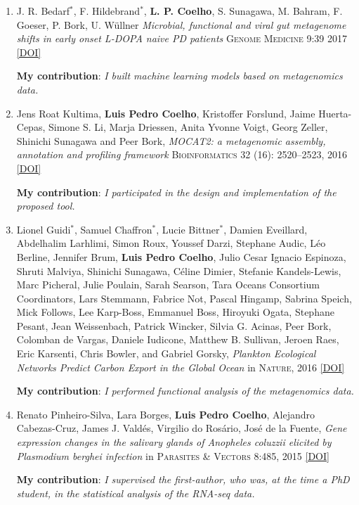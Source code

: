 \documentclass{article}
\newcommand\showdoi[1]{%
    \href{http://dx.doi.org/#1}{[DOI]}%
}
\newcommand\pubname[1]{\textsc{#1}}
\newcommand\contribution[1]{\relax\hfill\break\textbf{My contribution}: \textit{#1}}
\begin{document}
\begin{enumerate}[resume]
\item J. R. Bedarf${}^{*}$, F. Hildebrand${}^{*}$, \textbf{L. P. Coelho}, S.
Sunagawa, M. Bahram, F. Goeser, P. Bork, U. Wüllner \emph{Microbial, functional
and viral gut metagenome shifts in early onset L-DOPA naive PD patients}
\pubname{Genome Medicine} 9:39 2017 \showdoi{10.1186/s13073-017-0428-y}
\contribution{I built machine learning models based on metagenomics data.}

\item Jens Roat Kultima, \textbf{Luis Pedro Coelho}, Kristoffer Forslund, Jaime
Huerta-Cepas, Simone S. Li, Marja Driessen, Anita Yvonne Voigt, Georg Zeller,
Shinichi Sunagawa and Peer Bork, \emph{MOCAT2: a metagenomic assembly,
annotation and profiling framework} \pubname{Bioinformatics} 32 (16):
2520--2523, 2016 \showdoi{10.1093/bioinformatics/btw183}
\contribution{I participated in the design and implementation of the proposed tool.}

\item Lionel Guidi${}^{*}$, Samuel Chaffron${}^{*}$, Lucie Bittner${}^{*}$,
Damien Eveillard, Abdelhalim Larhlimi, Simon Roux, Youssef Darzi, Stephane
Audic, Léo Berline, Jennifer Brum, \textbf{Luis Pedro Coelho}, Julio Cesar
Ignacio Espinoza, Shruti Malviya, Shinichi Sunagawa, Céline Dimier, Stefanie
Kandels-Lewis, Marc Picheral, Julie Poulain, Sarah Searson, Tara Oceans
Consortium Coordinators, Lars Stemmann, Fabrice Not, Pascal Hingamp, Sabrina
Speich, Mick Follows, Lee Karp-Boss, Emmanuel Boss, Hiroyuki Ogata, Stephane
Pesant, Jean Weissenbach, Patrick Wincker, Silvia G. Acinas, Peer Bork,
Colomban de Vargas, Daniele Iudicone, Matthew B. Sullivan, Jeroen Raes, Eric
Karsenti, Chris Bowler, and Gabriel Gorsky, \emph{Plankton Ecological Networks
Predict Carbon Export in the Global Ocean} in \pubname{Nature}, 2016
\showdoi{10.1038/nature16942}
\contribution{I performed functional analysis of the metagenomics data.}

\item Renato Pinheiro-Silva, Lara Borges, \textbf{Luis Pedro Coelho}, Alejandro
Cabezas-Cruz, James J. Valdés, Virgilio do Rosário, José de la Fuente,
\emph{Gene expression changes in the salivary glands of Anopheles coluzzii
elicited by Plasmodium berghei infection} in \pubname{Parasites \& Vectors}
8:485, 2015 \showdoi{10.1186/s13071-015-1079-8}
\contribution{I supervised the first-author, who was, at the time a PhD
student, in the statistical analysis of the RNA-seq data.}


\end{enumerate}
\end{document}
